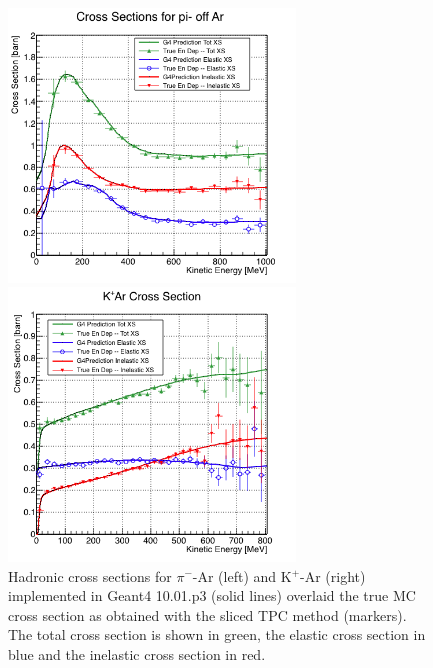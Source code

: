 {%
\begin{figure}
\begin{minipage}[b]{.53\textwidth}  
  \centering  
\includegraphics[width=3in]{Chapter-4/Images/PionTrueXS.png}
\end{minipage}%
\begin{minipage}[b]{0.53\textwidth}  
  \centering  
\includegraphics[width=3in]{Chapter-4/Images/KaonTrueXS.png}
\end{minipage}
\label{fig:TrueMCXS}
\caption{Hadronic cross sections for $\pi^-$-Ar (left) and K$^+$-Ar (right) implemented in Geant4 10.01.p3 (solid lines) overlaid the true MC cross section as obtained with the sliced TPC method (markers). The total cross section is shown in green,  the elastic cross section in blue and the inelastic cross section in red.}
\end{figure}


}
